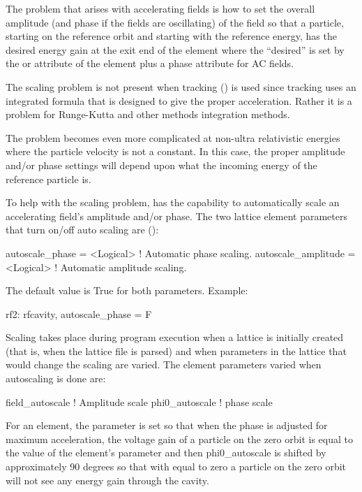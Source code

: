 The problem that arises with accelerating fields is how to set the overall amplitude (and phase if
the fields are oscillating) of the field so that a particle, starting on the reference orbit and
starting with the reference energy, has the desired energy gain at the exit end of the element where
the ``desired'' is set by the  or  attribute of the element plus a
 phase attribute for AC fields.

The scaling problem is not present when  tracking () is used since
 tracking uses an integrated formula that is designed to give the proper
acceleration. Rather it is a problem for Runge-Kutta and other methods integration methods.

The problem becomes even more complicated at non-ultra relativistic energies where the particle
velocity is not a constant. In this case, the proper amplitude and/or phase settings will depend
upon what the incoming energy of the reference particle is.

To help with the scaling problem, \bmad has the capability to automatically scale an accelerating
field's amplitude and/or phase. The two lattice element parameters that turn on/off auto scaling are
():
\begin{example}
  autoscale_phase      = <Logical>  ! Automatic phase scaling.
  autoscale_amplitude  = <Logical>  ! Automatic amplitude scaling.
\end{example}
The default value is True for both parameters. Example:
\begin{example}
  rf2: rfcavity, autoscale_phase = F
\end{example}

Scaling takes place during program execution when a lattice is initially created (that is,
when the lattice file is parsed) and when parameters in the lattice that would change the
scaling are varied.  The element parameters varied when autoscaling is done are:
\begin{example}
  field_autoscale       ! Amplitude scale
  phi0_autoscale        ! phase scale
\end{example}
For an  element, the  parameter is set so that when the phase is
adjusted for maximum acceleration, the voltage gain of a particle on the zero orbit is equal to the
value of the element's  parameter and then phi0_autoscale is shifted by approximately 90
degrees so that with  equal to zero a particle on the zero orbit will not see any energy
gain through the cavity.

